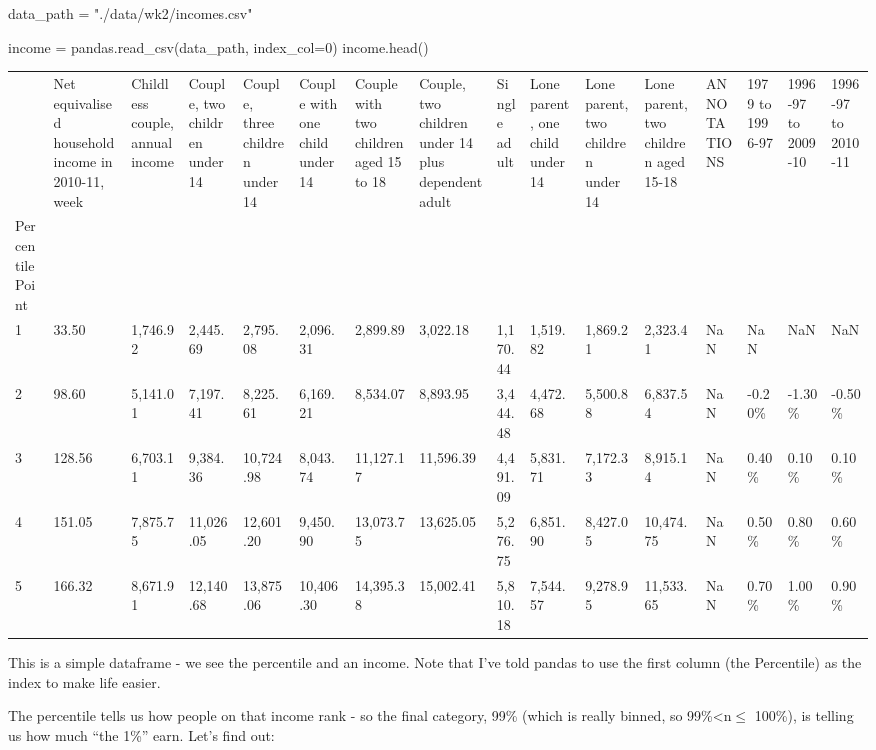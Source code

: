 \documentclass[
  letterpaper,
  DIV=11,
  numbers=noendperiod]{scrreprt}
\newenvironment{Shaded}{\begin{snugshade}}{\end{snugshade}}
\newcommand{\DecValTok}[1]{\textcolor[rgb]{0.68,0.00,0.00}{#1}}
\newcommand{\NormalTok}[1]{\textcolor[rgb]{0.00,0.23,0.31}{#1}}
\newcommand{\OperatorTok}[1]{\textcolor[rgb]{0.37,0.37,0.37}{#1}}
\newcommand{\StringTok}[1]{\textcolor[rgb]{0.13,0.47,0.30}{#1}}
\begin{document}
\begin{Shaded}
\begin{Highlighting}[]
\NormalTok{data\_path }\OperatorTok{=} \StringTok{"./data/wk2/incomes.csv"}

\NormalTok{income }\OperatorTok{=}\NormalTok{  pandas.read\_csv(data\_path, index\_col}\OperatorTok{=}\DecValTok{0}\NormalTok{)}
\NormalTok{income.head()}
\end{Highlighting}
\end{Shaded}

\begin{longtable}[]{@{}llllllllllllllll@{}}
\toprule()
& Net equivalised household income in 2010-11, week & Childless couple,
annual income & Couple, two children under 14 & Couple, three children
under 14 & Couple with one child under 14 & Couple with two children
aged 15 to 18 & Couple, two children under 14 plus dependent adult &
Single adult & Lone parent, one child under 14 & Lone parent, two
children under 14 & Lone parent, two children aged 15-18 & ANNOTATIONS &
1979 to 1996-97 & 1996-97 to 2009-10 & 1996-97 to 2010-11 \\
Percentile Point & & & & & & & & & & & & & & & \\
\midrule()
\endhead
1 & 33.50 & 1,746.92 & 2,445.69 & 2,795.08 & 2,096.31 & 2,899.89 &
3,022.18 & 1,170.44 & 1,519.82 & 1,869.21 & 2,323.41 & NaN & NaN & NaN &
NaN \\
2 & 98.60 & 5,141.01 & 7,197.41 & 8,225.61 & 6,169.21 & 8,534.07 &
8,893.95 & 3,444.48 & 4,472.68 & 5,500.88 & 6,837.54 & NaN & -0.20\% &
-1.30\% & -0.50\% \\
3 & 128.56 & 6,703.11 & 9,384.36 & 10,724.98 & 8,043.74 & 11,127.17 &
11,596.39 & 4,491.09 & 5,831.71 & 7,172.33 & 8,915.14 & NaN & 0.40\% &
0.10\% & 0.10\% \\
4 & 151.05 & 7,875.75 & 11,026.05 & 12,601.20 & 9,450.90 & 13,073.75 &
13,625.05 & 5,276.75 & 6,851.90 & 8,427.05 & 10,474.75 & NaN & 0.50\% &
0.80\% & 0.60\% \\
5 & 166.32 & 8,671.91 & 12,140.68 & 13,875.06 & 10,406.30 & 14,395.38 &
15,002.41 & 5,810.18 & 7,544.57 & 9,278.95 & 11,533.65 & NaN & 0.70\% &
1.00\% & 0.90\% \\
\bottomrule()
\end{longtable}

This is a simple dataframe - we see the percentile and an income. Note
that I've told pandas to use the first column (the Percentile) as the
index to make life easier.

The percentile tells us how people on that income rank - so the final
category, 99\% (which is really binned, so 99\%\textless n\(\leq\)
100\%), is telling us how much ``the 1\%'' earn. Let's find out:
\end{document}
